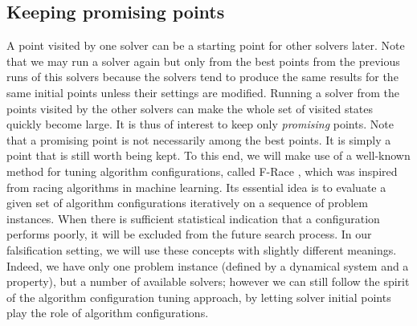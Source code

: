 \subsection{Keeping promising points}
A point visited by one solver can be a starting point for other solvers later. Note that we may run a solver again but only from the best points from the previous runs of this solvers because the solvers tend to produce the same results for the same initial points unless their settings are modified. Running a solver from the points visited by the other solvers can make the whole set of visited states quickly become large. It is thus of interest to keep only {\em promising} points. Note that a promising point is not necessarily among the best points. It is simply a point that is still worth being kept. To this end, we will make use of a well-known method for tuning algorithm configurations, called F-Race \cite{Birattari2010}, which was inspired from racing algorithms in machine learning. Its essential idea is to evaluate a given set of algorithm configurations iteratively on a sequence of problem instances. When there is sufficient statistical indication that a configuration performs poorly, it will be excluded from the future search process. %
In our falsification setting, we will use these concepts with slightly different meanings. Indeed, we have only one problem instance (defined by a dynamical system and a property), but a number of available solvers; however we can still follow the spirit of the algorithm configuration tuning approach, by letting solver initial points play the role of algorithm configurations.

